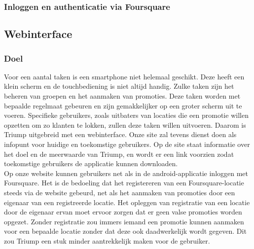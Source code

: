 \subsubsection{Inloggen en authenticatie via Foursquare}


\subsection{Webinterface}
\subsubsection{Doel}
Voor een aantal taken is een smartphone niet helemaal geschikt. Deze heeft een klein scherm en de touchbediening is niet altijd handig. Zulke taken zijn het beheren van groepen en het aanmaken van promoties.
Deze taken worden met bepaalde regelmaat gebeuren en zijn gemakkelijker op een groter scherm uit te voeren. Specifieke gebruikers, zoals uitbaters van locaties die een promotie willen opzetten om zo klanten te lokken, zullen deze taken willen uitvoeren. Daarom is Triump uitgebreid met een webinterface.
Onze site zal tevens dienst doen als infopunt voor huidige en toekomstige gebruikers. Op de site staat informatie over het doel en de meerwaarde van Triump, en wordt er een link voorzien zodat toekomstige gebruikers de applicatie kunnen downloaden.\\
Op onze website kunnen gebruikers net als in de android-applicatie inloggen met Foursquare. Het is de bedoeling dat het registereren van een Foursquare-locatie steeds via de website gebeurd, net als het aanmaken van promoties door een eigenaar van een registreerde locatie. Het opleggen van registratie van een locatie door de eigenaar ervan moet ervoor zorgen dat er geen valse promoties worden opgezet. Zonder registratie zou immers iemand een promotie kunnen aanmaken voor een bepaalde locatie zonder dat deze ook daadwerkelijk wordt gegeven. Dit zou Triump een stuk minder aantrekkelijk maken voor de gebruiker.

